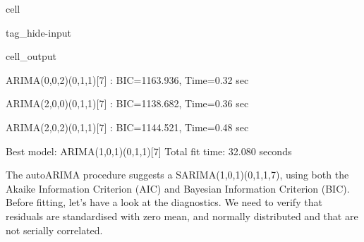 \documentclass[letterpaper,10pt,english]{jupyterBook}
\begin{document}
\begin{sphinxuseclass}{cell}
\begin{sphinxuseclass}{tag_hide-input}
\begin{sphinxuseclass}{cell_output}
\begin{sphinxVerbatim}[commandchars=\\\{\}]
 ARIMA(0,0,2)(0,1,1)[7]             : BIC=1163.936, Time=0.32 sec
\end{sphinxVerbatim}

\begin{sphinxVerbatim}[commandchars=\\\{\}]
 ARIMA(2,0,0)(0,1,1)[7]             : BIC=1138.682, Time=0.36 sec
\end{sphinxVerbatim}

\begin{sphinxVerbatim}[commandchars=\\\{\}]
 ARIMA(2,0,2)(0,1,1)[7]             : BIC=1144.521, Time=0.48 sec

Best model:  ARIMA(1,0,1)(0,1,1)[7]          
Total fit time: 32.080 seconds
\end{sphinxVerbatim}

\end{sphinxuseclass}
\end{sphinxuseclass}
\end{sphinxuseclass}
\sphinxAtStartPar
The auto\sphinxhyphen{}ARIMA procedure suggests a SARIMA(1,0,1)(0,1,1,7), using both the Akaike Information Criterion (AIC) and Bayesian Information Criterion (BIC). Before fitting, let’s have a look at the diagnostics. We need to verify that residuals are standardised with zero mean, and normally distributed and that are not serially correlated.
\end{document}
